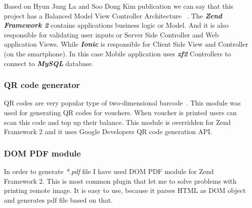 		
		
		Based on Hyun Jung La and Soo Dong Kim publication we can say that this project has a Balanced Model View Controller Architecture ~\cite{MVC_Architecture_for_Developing_Service-based_Mobile_Applications}. The \textbf{\textit{Zend Framework 2}} contains applications business logic or Model. And it is also responsible for validating user inputs or Server Side Controller and  Web application Views. While \textbf{\textit{Ionic}} is responsible for Client Side View and Controller (on the smartphone). In this case Mobile application uses \textbf{\textit{zf2}} Controllers to connect to \textbf{\textit{MySQL}} database.


			\subsubsection{QR code generator}
			QR codes are very popular type of two-dimensional barcode~\cite{QR_code_google}. This module was used for generating QR codes for vouchers. When voucher is printed users can scan this code and top up their balance. This module is overridden  for Zend Framework 2 and it uses Google Developers QR code generation API.~\cite{QR_code_generator}
			
			\subsubsection{DOM PDF module}
			In order to generate \textit{*.pdf} file I have used DOM PDF module for Zend Framework 2. This is most common plugin that let me to solve problems with printing remote image. It is easy to use, because it parses HTML as DOM object and generates pdf file based on that.~\cite{DOM_PDF_module}

